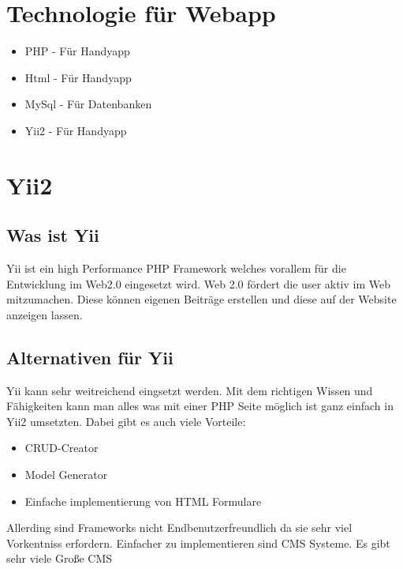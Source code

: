 	\def \currentAuthor {Florian Tipotsch}
	\section{Technologie für Webapp}
\begin{itemize}
	\item PHP - Für Handyapp
	\item Html - Für Handyapp 	
	\item MySql - Für Datenbanken
	\item Yii2 - Für Handyapp
\end{itemize}
	\section{Yii2}
	\subsection{Was ist Yii}
	Yii ist ein high Performance PHP Framework welches vorallem für die Entwicklung im Web2.0 eingesetzt wird. Web 2.0 fördert die user aktiv im Web mitzumachen. Diese können eigenen Beiträge erstellen und diese auf der Website anzeigen lassen.
\cite{https://en.wikipedia.org/wiki/Web_2.0}
	\subsection{Alternativen für Yii}
	Yii kann sehr weitreichend eingsetzt werden. Mit dem richtigen Wissen und Fähigkeiten kann man alles was mit einer PHP Seite möglich ist ganz einfach in Yii2 umsetzten. Dabei gibt es auch viele Vorteile:
\begin{itemize}
\item CRUD-Creator
\item Model Generator
\item Einfache implementierung von HTML Formulare
\end{itemize}
Allerding sind Frameworks nicht Endbenutzerfreundlich da sie sehr viel Vorkentniss erfordern. Einfacher zu implementieren sind CMS Systeme. Es gibt sehr viele Große CMS 
